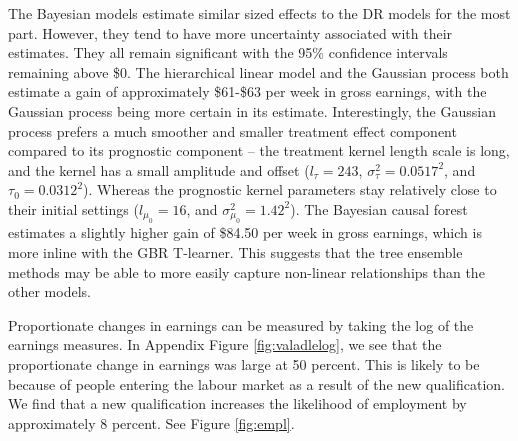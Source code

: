 \documentclass[12pt, a4paper]{article}
\begin{document}
The Bayesian models estimate similar sized effects to the DR models for the
most part. However, they tend to have more uncertainty associated with their
estimates. They all remain significant with the 95\% confidence intervals
remaining above \$0. The hierarchical linear model and the Gaussian process
both estimate a gain of approximately \$61-\$63 per week in gross earnings,
with the Gaussian process being more certain in its estimate. Interestingly,
the Gaussian process prefers a much smoother and smaller treatment effect
component compared to its prognostic component -- the treatment kernel length
scale is long, and the kernel has a small amplitude and offset ($l_\tau = 243$,
$\sigma_\tau^2 = 0.0517^2$, and $\tau_0 = 0.0312^2$). Whereas the prognostic
kernel parameters stay relatively close to their initial settings ($l_{\mu_0} =
16$, and $\sigma^2_{\mu_0} = 1.42^2$). The Bayesian causal forest estimates a
slightly higher gain of \$84.50 per week in gross earnings, which is more inline
with the GBR T-learner. This suggests that the tree ensemble methods may be
able to more easily capture non-linear relationships than the other models.

%

Proportionate changes in earnings can be measured by taking the log of the earnings measures. In Appendix Figure \ref{fig:valadlelog}, we see that the proportionate change in earnings was large at 50 percent. This is likely to be because of people entering the labour market as a result of the new qualification. We find that a new qualification increases the likelihood of employment by approximately 8 percent. See Figure \ref{fig:empl}.
\end{document}

